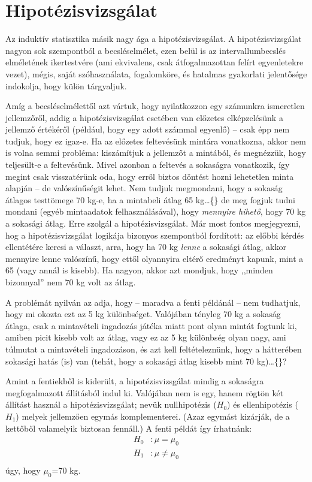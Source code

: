 \documentclass[
]{book}
\begin{document}
\hypertarget{induktivhipotezisvizsgalat}{%
\section{Hipotézisvizsgálat}\label{induktivhipotezisvizsgalat}}

Az induktív statisztika másik nagy ága a hipotézisvizsgálat. A hipotézisvizsgálat nagyon sok szempontból a becsléselmélet, ezen belül is az intervallumbecslés elméletének ikertestvére (ami ekvivalens, csak átfogalmazottan felírt egyenletekre vezet), mégis, saját szóhasználata, fogalomköre, és hatalmas gyakorlati jelentősége indokolja, hogy külön tárgyaljuk.

Amíg a becsléselmélettől azt vártuk, hogy nyilatkozzon egy számunkra ismeretlen jellemzőről, addig a hipotézisvizsgálat esetében van előzetes elképzelésünk a jellemző értékéről (például, hogy egy adott számmal egyenlő) -- csak épp nem tudjuk, hogy ez igaz-e. Ha az előzetes feltevésünk mintára vonatkozna, akkor nem is volna semmi probléma: kiszámítjuk a jellemzőt a mintából, és megnézzük, hogy teljesült-e a feltevésünk. Mivel azonban a feltevés a sokaságra vonatkozik, így megint csak visszatérünk oda, hogy erről biztos döntést hozni lehetetlen minta alapján -- de valószínűségit lehet. Nem tudjuk megmondani, hogy a sokaság átlagos testtömege 70 kg-e, ha a mintabeli átlag 65 kg\dots\{\} de meg fogjuk tudni mondani (egyéb mintaadatok felhasználásával), hogy \emph{mennyire hihető}, hogy 70 kg a sokasági átlag. Erre szolgál a hipotézisvizsgálat. Már most fontos megjegyezni, hog a hipotézisvizsgálat logikája bizonyos szempontból fordított: az előbbi kérdés ellentétére keresi a választ, arra, hogy ha 70 kg \emph{lenne} a sokasági átlag, akkor mennyire lenne valószínű, hogy ettől olyannyira eltérő eredményt kapunk, mint a 65 (vagy annál is kisebb). Ha nagyon, akkor azt mondjuk, hogy ,,minden bizonnyal'' nem 70 kg volt az átlag.

A problémát nyilván az adja, hogy -- maradva a fenti példánál -- nem tudhatjuk, hogy mi okozta ezt az 5 kg különbséget. Valójában tényleg 70 kg a sokaság átlaga, csak a mintavételi ingadozás játéka miatt pont olyan mintát fogtunk ki, amiben picit kisebb volt az átlag, vagy ez az 5 kg különbség olyan nagy, ami túlmutat a mintavételi ingadozáson, és azt kell feltételeznünk, hogy a hátterében sokasági hatás (is) van (tehát, hogy a sokasági átlag kisebb mint 70 kg)\dots\{\}?

Amint a fentiekből is kiderült, a hipotézisvizsgálat mindig a sokaságra megfogalmazott állításból indul ki. Valójában nem is egy, hanem rögtön két állítást használ a hipotézisvizsgálat; nevük nullhipotézis (\(H_0\)) és ellenhipotézis (\(H_1\)) melyek jellemzően egymás komplementerei. (Azaz egymást kizárják, de a kettőből valamelyik biztosan fennáll.) A fenti példát így írhatnánk:
\begin{align*}
    H_0&: \mu = \mu_0\\
    H_1&: \mu \neq \mu_0\\
\end{align*}
úgy, hogy \(\mu_0\)=70 kg.
\end{document}
